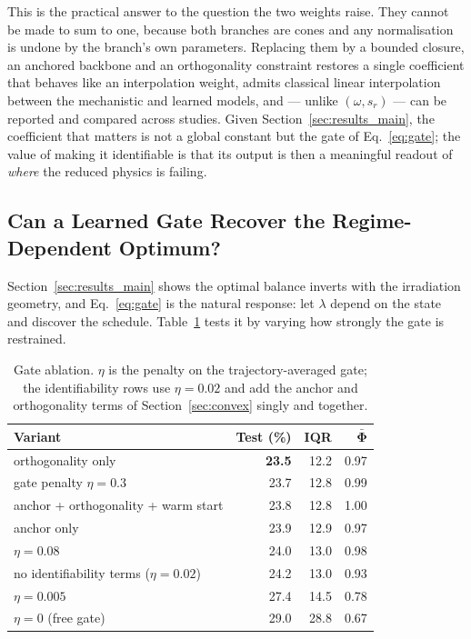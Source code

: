 This is the practical answer to the question the two weights raise. They cannot
be made to sum to one, because both branches are cones and any normalisation is
undone by the branch's own parameters. Replacing them by a bounded closure, an
anchored backbone and an orthogonality constraint restores a single coefficient
that behaves like an interpolation weight, admits classical linear interpolation
between the mechanistic and learned models, and --- unlike $(\omega,s_r)$ ---
can be reported and compared across studies. Given
Section~\ref{sec:results_main}, the coefficient that matters is not a global
constant but the gate of Eq.~\eqref{eq:gate}; the value of making it
identifiable is that its output is then a meaningful readout of \emph{where}
the reduced physics is failing.

\subsection{Can a Learned Gate Recover the Regime-Dependent Optimum?}
\label{sec:results_gate}

Section~\ref{sec:results_main} shows the optimal balance inverts with the
irradiation geometry, and Eq.~\eqref{eq:gate} is the natural response: let
$\lambda$ depend on the state and discover the schedule. Table~\ref{tab:gate}
tests it by varying how strongly the gate is restrained.

\begin{table}[H]
\caption{Gate ablation. $\eta$ is the penalty on the trajectory-averaged gate;
the identifiability rows use $\eta = 0.02$ and add the anchor and orthogonality
terms of Section~\ref{sec:convex} singly and together.}
\label{tab:gate}
\centering\scriptsize
\setlength{\tabcolsep}{5pt}
\begin{tabular}{lrrr}
\hline
\textbf{Variant} & \textbf{Test (\%)} & \textbf{IQR} & $\bm{\bar\Phi}$ \\
\hline
orthogonality only & \textbf{23.5} & 12.2 & 0.97 \\
gate penalty $\eta = 0.3$ & 23.7 & 12.8 & 0.99 \\
anchor + orthogonality + warm start & 23.8 & 12.8 & 1.00 \\
anchor only & 23.9 & 12.9 & 0.97 \\
$\eta = 0.08$ & 24.0 & 13.0 & 0.98 \\
no identifiability terms ($\eta = 0.02$) & 24.2 & 13.0 & 0.93 \\
$\eta = 0.005$ & 27.4 & 14.5 & 0.78 \\
$\eta = 0$ (free gate) & 29.0 & 28.8 & 0.67 \\
\hline
\end{tabular}
\end{table}

